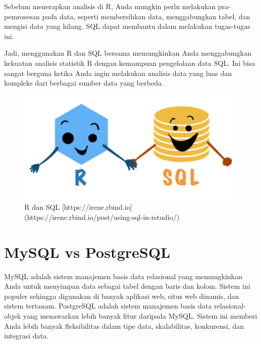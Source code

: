 \documentclass[
]{book}
\begin{document}
Sebelum menerapkan analisis di R, Anda mungkin perlu melakukan pra-pemrosesan pada data, seperti membersihkan data, menggabungkan tabel, dan mengisi data yang hilang. SQL dapat membantu dalam melakukan tugas-tugas ini.

Jadi, menggunakan R dan SQL bersama memungkinkan Anda menggabungkan kekuatan analisis statistik R dengan kemampuan pengelolaan data SQL. Ini bisa sangat berguna ketika Anda ingin melakukan analisis data yang luas dan kompleks dari berbagai sumber data yang berbeda.

\begin{figure}

{\centering \includegraphics[width=1\linewidth]{./images/Bab1/sql-r-friends} 

}

\caption{R dan SQL [https://irene.rbind.io](https://irene.rbind.io/post/using-sql-in-rstudio/)}\label{fig:sql-r-friends}
\end{figure}

\hypertarget{mysql-vs-postgresql}{%
\section{MySQL vs PostgreSQL}\label{mysql-vs-postgresql}}

MySQL adalah sistem manajemen basis data relasional yang memungkinkan Anda untuk menyimpan data sebagai tabel dengan baris dan kolom. Sistem ini populer sehingga digunakan di banyak aplikasi web, situs web dinamis, dan sistem tertanam. PostgreSQL adalah sistem manajemen basis data relasional-objek yang menawarkan lebih banyak fitur daripada MySQL. Sistem ini memberi Anda lebih banyak fleksibilitas dalam tipe data, skalabilitas, konkurensi, dan integrasi data.
\end{document}
